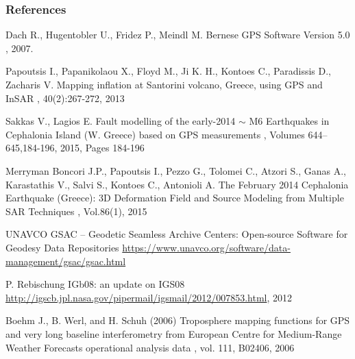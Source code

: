 \documentclass{beamer}
\begin{document}
\begin{frame}[allowframebreaks]
  \frametitle<presentation>{References}
  \begin{thebibliography}{10}


  \beamertemplatearticlebibitems

    Dach R., Hugentobler U., Fridez P., Meindl M.
    \newblock Bernese GPS Software Version 5.0
    , 2007.

    Papoutsis I., Papanikolaou X., Floyd M., Ji K. H., Kontoes C., Paradissis D., Zacharis V.
    \newblock Mapping inflation at Santorini volcano, Greece, using GPS and InSAR
    , 40(2):267-272, 2013

    Sakkas V., Lagios E.
    \newblock Fault modelling of the early-2014 $\sim$ M6 Earthquakes in Cephalonia Island (W. Greece) based on GPS measurements
    , Volumes 644–645,184-196, 2015, Pages 184-196

    Merryman Boncori J.P., Papoutsis I., Pezzo G., Tolomei C., Atzori S., Ganas A., Karastathis V., Salvi S., Kontoes C., Antonioli A.
    \newblock The February 2014 Cephalonia Earthquake (Greece): 3D Deformation Field and Source Modeling from Multiple SAR Techniques
    , Vol.86(1), 2015

    UNAVCO
    \newblock GSAC -- Geodetic Seamless Archive Centers: Open-source Software for Geodesy Data Repositories
     \url{https://www.unavco.org/software/data-management/gsac/gsac.html}

    P. Rebischung
    \newblock IGb08: an update on IGS08
     \url{http://igscb.jpl.nasa.gov/pipermail/igsmail/2012/007853.html}, 2012

    Boehm J., B. Werl, and H. Schuh (2006)
    \newblock Troposphere mapping functions for GPS and very long baseline interferometry from European Centre for
    Medium-Range Weather Forecasts operational analysis data
    , vol. 111, B02406, 2006

  \end{thebibliography}
\end{frame}
\end{document}
